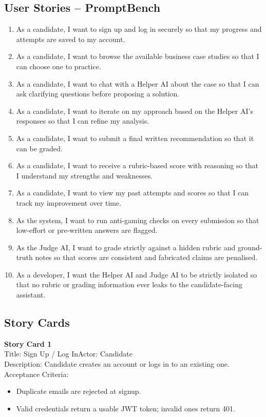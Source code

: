 \documentclass[12pt,a4paper]{report}
\begin{document}
\subsection*{User Stories -- PromptBench}
\begin{enumerate}[nosep]
    \item As a candidate, I want to sign up and log in securely so that my progress and attempts
    are saved to my account.
    \item As a candidate, I want to browse the available business case studies so that I can
    choose one to practice.
    \item As a candidate, I want to chat with a Helper AI about the case so that I can ask
    clarifying questions before proposing a solution.
    \item As a candidate, I want to iterate on my approach based on the Helper AI's responses so
    that I can refine my analysis.
    \item As a candidate, I want to submit a final written recommendation so that it can be
    graded.
    \item As a candidate, I want to receive a rubric-based score with reasoning so that I
    understand my strengths and weaknesses.
    \item As a candidate, I want to view my past attempts and scores so that I can track my
    improvement over time.
    \item As the system, I want to run anti-gaming checks on every submission so that low-effort
    or pre-written answers are flagged.
    \item As the Judge AI, I want to grade strictly against a hidden rubric and ground-truth notes
    so that scores are consistent and fabricated claims are penalised.
    \item As a developer, I want the Helper AI and Judge AI to be strictly isolated so that no
    rubric or grading information ever leaks to the candidate-facing assistant.
\end{enumerate}

\subsection*{Story Cards}

\noindent\textbf{Story Card 1}\\
Title: Sign Up / Log In\quad Actor: Candidate\\
Description: Candidate creates an account or logs in to an existing one.\\
Acceptance Criteria:
\begin{itemize}[nosep]
    \item Duplicate emails are rejected at signup.
    \item Valid credentials return a usable JWT token; invalid ones return 401.
\end{itemize}
\hrulefill
\end{document}
